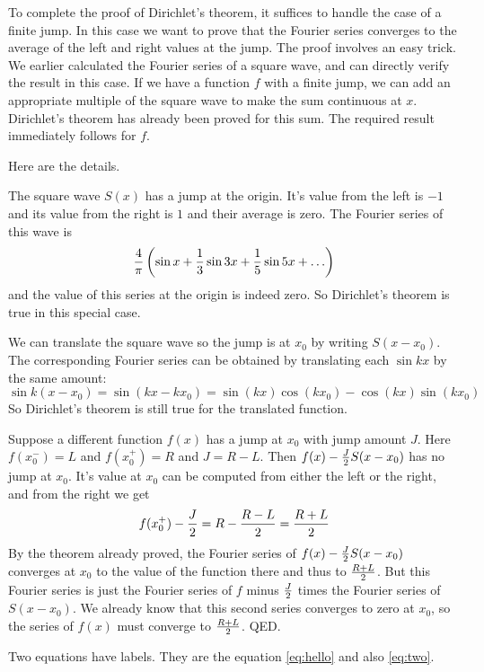 \documentclass[11pt, oneside]{article}   	%
\begin{document}
To complete the proof of Dirichlet's theorem, it suffices to handle the case of a finite jump. In this case we want to prove that the Fourier series converges to the average of the left and right values at the jump. The proof involves an easy trick. We earlier calculated the Fourier series of a square wave, and can directly verify the result in this case. If we have a function $f$ with a finite jump, we can add an appropriate multiple of the square wave to make the sum continuous at $x$. Dirichlet's theorem has already been proved for this sum. The required result immediately follows for $f$.

Here are the details. 

The square wave $S(x)$ has a jump at the origin. It's value from the left is $-1$ and its value from the right is $1$ and their average is zero. The Fourier series of this wave is
\[{4 \over \pi} \left( \sin x + {1 \over 3} \sin 3x + {1 \over 5} \sin 5x + \ldots \right)\]
and the value of this series at the origin is indeed zero. So Dirichlet's theorem is true in this special case.

We can translate the square wave so the jump is at $x_0$ by writing $S(x - x_0)$. The corresponding Fourier series can be obtained by translating each $\sin kx$ by the same amount: 
\[\sin k(x - x_0) = \sin (kx - k x_0) = \sin(kx) \cos (k x_0) - \cos(kx) \sin(k x_0)\] So Dirichlet's theorem is still true for the translated function.

Suppose a different function $f(x)$ has a jump at $x_0$ with jump amount $J$. Here $f(x_0^-) = L$ and
$f(x_0^+) = R$ and $J = R - L$. Then $f(x) - {J \over 2} S(x - x_0)$ has no jump at $x_0$. It's value at $x_0$
can be computed from either the left or the right, and from the right we get \[f(x_0^+) - {J \over 2} = R - {{R - L} \over 2} = {{R + L} \over 2}\]
By the theorem already proved, the Fourier series of $f(x) - {J \over 2} S(x - x_0)$ converges at $x_0$ to the value of the function there and thus to ${{R + L} \over 2}$. But this Fourier series is just the Fourier series of $f$ minus ${J \over 2}$ times the Fourier series of $S(x - x_0)$. We already know that this second series converges to zero at $x_0$,  so the series of $f(x)$ must converge to ${{R + L} \over 2}$. QED. 

Two equations have labels. They are the equation \ref{eq:hello} and also \eqref{eq:two}.
\end{document}
